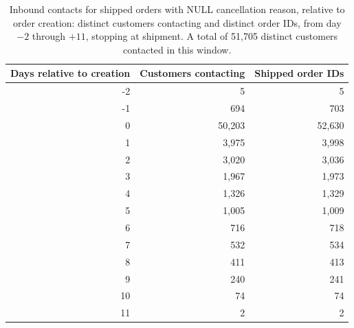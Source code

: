 \begin{table}[!htbp]
\centering
\caption{Inbound contacts for shipped orders with NULL cancellation reason, relative to order creation: distinct customers contacting and distinct order IDs, from day $-2$ through $+11$, stopping at shipment. A total of 51,705 distinct customers contacted in this window.}
\label{tab:shipped-customer-contacts-by-creation-day}
\begin{tabular}{@{}rrr@{}}
\toprule
Days relative to creation & Customers contacting & Shipped order IDs \\
\midrule
-2 & 5 & 5 \\
-1 & 694 & 703 \\
0 & 50,203 & 52,630 \\
1 & 3,975 & 3,998 \\
2 & 3,020 & 3,036 \\
3 & 1,967 & 1,973 \\
4 & 1,326 & 1,329 \\
5 & 1,005 & 1,009 \\
6 & 716 & 718 \\
7 & 532 & 534 \\
8 & 411 & 413 \\
9 & 240 & 241 \\
10 & 74 & 74 \\
11 & 2 & 2 \\
\bottomrule
\end{tabular}


\end{table}

